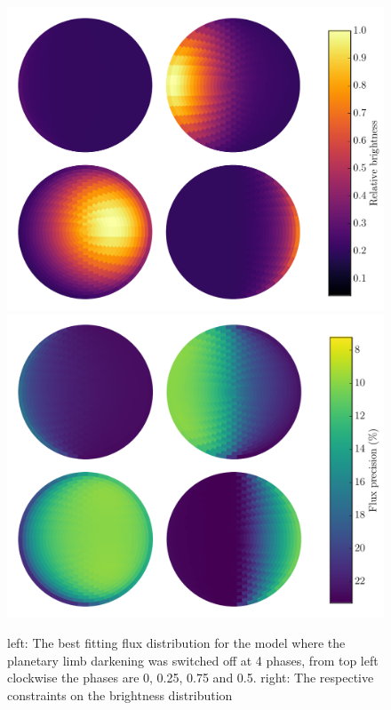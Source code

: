\documentclass[a4paper,fleqn,usenatbib]{mnras}
\begin{document}
\begin{figure}
\begin{center}
\includegraphics[width=\columnwidth]{img/free_parametersflux_map.pdf}
\includegraphics[width=\columnwidth]{img/free_parametersflux_errs.pdf}
\caption{left: The best fitting flux distribution for the model where the planetary limb darkening was switched off at 4 phases, from top left clockwise the phases are 0, 0.25, 0.75 and 0.5. right: The respective constraints on the brightness distribution}
\label{fig:best_fit_flux}
\end{center}
\end{figure}
\end{document}
